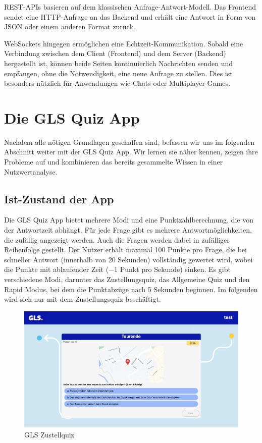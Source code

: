\documentclass[biblatex]{lni}
\begin{document}
REST-APIs basieren auf dem klassischen Anfrage-Antwort-Modell.
Das Frontend sendet eine HTTP-Anfrage an das Backend und erhält eine Antwort in Form von JSON oder einem anderen Format zurück.

WebSockets hingegen ermöglichen eine Echtzeit-Kommunikation.
Sobald eine Verbindung zwischen dem Client (Frontend) und dem Server (Backend) hergestellt ist,
können beide Seiten kontinuierlich Nachrichten senden und empfangen, ohne die Notwendigkeit, eine neue Anfrage zu stellen.
Dies ist besonders nützlich für Anwendungen wie Chats oder Multiplayer-Games.

\section{Die GLS Quiz App}

Nachdem alle nötigen Grundlagen geschaffen sind, befassen wir uns im folgenden Abschnitt weiter mit der GLS Quiz App.
Wir lernen sie näher kennen, zeigen ihre Probleme auf und kombinieren das bereits gesammelte Wissen in einer Nutzwertanalyse.

\subsection{Ist-Zustand der App}

Die GLS Quiz App bietet mehrere Modi und eine Punktzahlberechnung,
die von der Antwortzeit abhängt.
Für jede Frage gibt es mehrere Antwortmöglichkeiten,
die zufällig angezeigt werden.
Auch die Fragen werden dabei in zufälliger Reihenfolge gestellt.
Der Nutzer erhält maximal 100 Punkte pro Frage,
die bei schneller Antwort (innerhalb von 20 Sekunden) vollständig gewertet wird,
wobei die Punkte mit ablaufender Zeit (−1 Punkt pro Sekunde) sinken.
Es gibt verschiedene Modi, darunter das Zustellungsquiz,
das Allgemeine Quiz und den Rapid Modus, bei dem die Punktabzüge nach 5 Sekunden beginnen.
Im folgenden wird sich nur mit dem Zustellungsquiz beschäftigt.

\begin{figure}
  \centering
  \includegraphics[width=.8\textwidth]{gls-trainee}
  \caption{GLS Zustellquiz}
  \label{fig:gls-trainee}
\end{figure}
\end{document}
